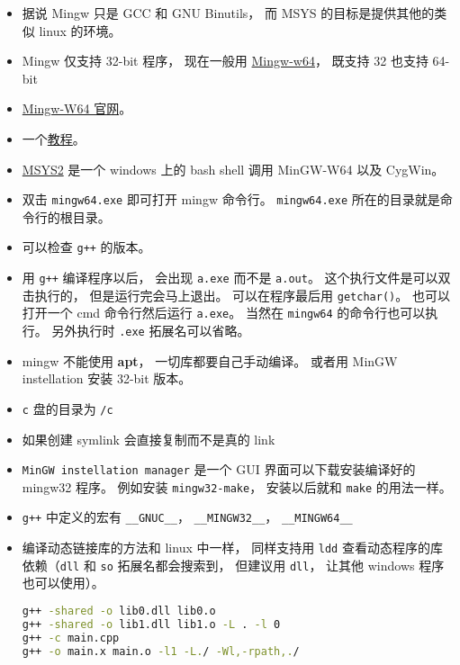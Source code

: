 
\begin{itemize}
\item 据说 Mingw 只是 GCC 和 GNU Binutils， 而 MSYS 的目标是提供其他的类似 linux 的环境。
\item Mingw 仅支持 32-bit 程序， 现在一般用 \href{https://en.wikipedia.org/wiki/Mingw-w64}{Mingw-w64}， 既支持 32 也支持 64-bit
\item \href{https://www.mingw-w64.org/}{Mingw-W64 官网}。
\item 一个\href{https://www3.ntu.edu.sg/home/ehchua/programming/howto/Cygwin_HowTo.html}{教程}。
\item \href{https://www.msys2.org/}{MSYS2} 是一个 windows 上的 bash shell 调用 MinGW-W64 以及 CygWin。
\item 双击 \verb|mingw64.exe| 即可打开 mingw 命令行。 \verb|mingw64.exe| 所在的目录就是命令行的根目录。
\item 可以检查 \verb|g++| 的版本。
\item 用 \verb|g++| 编译程序以后， 会出现 \verb|a.exe| 而不是 \verb|a.out|。 这个执行文件是可以双击执行的， 但是运行完会马上退出。 可以在程序最后用 \verb|getchar()|。 也可以打开一个 cmd 命令行然后运行 \verb|a.exe|。 当然在 \verb|mingw64| 的命令行也可以执行。 另外执行时 \verb|.exe| 拓展名可以省略。
\item mingw 不能使用 \textbf{apt}， 一切库都要自己手动编译。 或者用 MinGW instellation 安装 32-bit 版本。
\item \verb|c| 盘的目录为 \verb|/c|
\item 如果创建 symlink 会直接复制而不是真的 link
\item \verb|MinGW instellation manager| 是一个 GUI 界面可以下载安装编译好的 mingw32 程序。 例如安装 \verb|mingw32-make|， 安装以后就和 \verb|make| 的用法一样。
\item \verb|g++| 中定义的宏有 \verb|__GNUC__|， \verb|__MINGW32__|， \verb|__MINGW64__|
\item 编译动态链接库的方法和 linux 中一样， 同样支持用 \verb|ldd| 查看动态程序的库依赖（\verb|dll| 和 \verb|so| 拓展名都会搜索到， 但建议用 \verb|dll|， 让其他 windows 程序也可以使用）。
\begin{lstlisting}[language=bash]
g++ -shared -o lib0.dll lib0.o
g++ -shared -o lib1.dll lib1.o -L . -l 0
g++ -c main.cpp
g++ -o main.x main.o -l1 -L./ -Wl,-rpath,./
\end{lstlisting}
\end{itemize}

